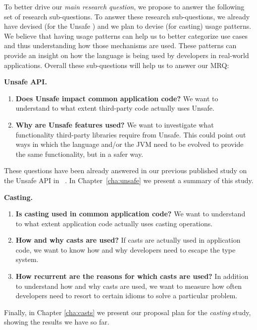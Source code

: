 To better drive our \emph{main research question}, we propose to answer the following set of research sub-questions.
To answer these research sub-questions, we already have devised (for the Unsafe \api{}) and we plan to devise (for casting) usage patterns.
We believe that having usage patterns can help us to better categorize use cases and thus understanding how those mechanisms are used.
These patterns can provide an insight on how the language is being used by developers in real-world applications.
Overall these sub-questions will help us to answer our MRQ:

\textbf{Unsafe API.}
\begin{enumerate}[label=$URQ\arabic*:$,ref=$URQ\arabic*$,leftmargin=3.4\parindent]
\item\label{unsafe:rq1}
{\bf Does Unsafe impact common application code?}
We want to understand to what extent third-party code actually uses Unsafe.

\item\label{unsafe:rq2}
{\bf Why are Unsafe features used?}
We want to investigate what functionality third-party libraries require from Unsafe.
This could point out ways in which the \java{} language and/or the JVM need to be evolved to provide the same functionality, but in a safer way.
\end{enumerate}

These questions have been already answered in our previous published study on the Unsafe API in \java{}~\cite{mastrangeloUseYourOwn2015}.
In Chapter~\ref{cha:unsafe} we present a summary of this study.

\textbf{Casting.}
\begin{enumerate}[label=$CRQ\arabic*:$,ref=$CRQ\arabic*$,leftmargin=3.4\parindent]
\item\label{casts:rq1}
{\bf Is casting used in common application code?}
We want to understand to what extent application code actually uses casting operations.

\item\label{casts:rq2}
{\bf How and why casts are used?}
If casts are actually used in application code,
we want to know how and why developers need to escape the type system.

\item\label{casts:rq3}
{\bf How recurrent are the reasons for which casts are used?}
In addition to understand how and why casts are used,
we want to measure how often developers need to resort to certain idioms to solve a particular problem.
\end{enumerate}





Finally, in Chapter \ref{cha:casts} we present our proposal plan for the \emph{casting} study, showing the results we have so far.

